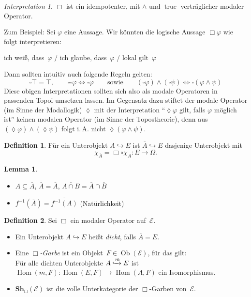 \documentclass{article}
\theoremstyle{definition}
\newtheorem*{defn}{Definition}
\newtheorem*{lem}{Lemma}
\theoremstyle{remark}
\newtheorem*{interp}{Interpretation}
\newcommand{\?}{\,{:}\,}
\renewcommand{\_}{\mathpunct{.}\,}
\DeclareMathOperator{\Ob}{Ob} %
\DeclareMathOperator{\Hom}{Hom} %
\DeclareMathOperator{\true}{true} %
\newcommand{\clos}[1]{\overline{{#1}}} %
\newcommand{\Sh}{\mathbf{Sh}} %
\newcommand{\Eat}{\mathcal{E}} %
\begin{document}
\begin{interp}
  $\Box$ ist ein idempotenter, mit ${\wedge}$ und $\true$ verträglicher modaler Operator.

  Zum Beispiel: Sei $\varphi$ eine Aussage. Wir könnten die logische Aussage $\Box \varphi$ wie folgt interpretieren:
  \begin{center}
    ich weiß, dass~$\varphi$ / ich glaube, dass~$\varphi$ / lokal gilt~$\varphi$
  \end{center}
  Dann sollten intuitiv auch folgende Regeln gelten:
  \[
    \square \top = \top, \qquad
    \square \square \varphi \iff \square \varphi
    \qquad \text{sowie} \qquad
    (\square \varphi) \wedge (\square \psi) \iff \square (\varphi \wedge \psi)
  \]
  Diese obigen Interpretationen sollten sich also als modale Operatoren in passenden Topoi umsetzen lassen.
  Im Gegensatz dazu stiftet der modale Operator (im Sinne der Modallogik) $\lozenge$ mit der Interpretation "`$\lozenge \varphi$ gilt, falls $\varphi$ möglich ist"' keinen modalen Operator (im Sinne der Topostheorie), denn aus $(\lozenge \varphi) \wedge (\lozenge \psi)$ folgt i.\,A. nicht $\lozenge (\varphi \wedge \psi)$.
\end{interp}

\begin{defn}
  Für ein Unterobjekt $A \hookrightarrow E$ ist $\clos{A} \hookrightarrow E$ dasjenige Unterobjekt mit
  \[ \chi_{\clos{A}} = \Box \circ \chi_A : E \to \Omega. \]
\end{defn}

\begin{lem}
  \begin{minipage}[t]{0.8 \linewidth}\begin{itemize}
    \item
      $A \subseteq \clos{A}$, \quad
      $\clos{\clos{A}} = \clos{A}$, \quad
      $\clos{A \cap B} = \clos{A} \cap \clos{B}$
    \item $f^{-1}(\clos{A}) = \clos{f^{-1}(A)}$ \enspace (Natürlichkeit) \qquad
  \end{itemize}\end{minipage}
\end{lem}

\begin{defn}
  Sei $\Box$ ein modaler Operator auf~$\Eat$.
  \begin{itemize}[itemsep=0pt]
    \item Ein Unterobjekt $A \hookrightarrow E$ heißt \emph{dicht}, falls $\clos{A} = E$.
    \item
      Eine \emph{$\Box$-Garbe} ist ein Objekt~$F \in \Ob(\Eat)$, für das gilt: \\
      Für alle dichten Unterobjekte $A \xhookrightarrow{m} E$ ist $\Hom(m, F) : \Hom(E, F) \to \Hom(A, F)$ ein Isomorphismus.
    \item $\Sh_\Box(\Eat)$ ist die volle Unterkategorie der $\Box$-Garben von~$\Eat$.
  \end{itemize}
\end{defn}
\end{document}
